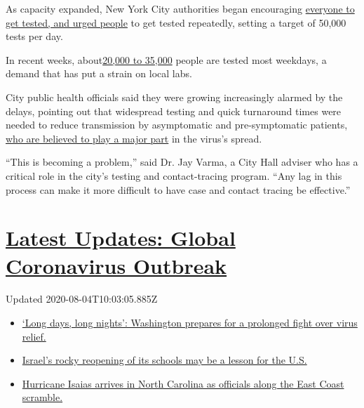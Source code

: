 As capacity expanded, New York City authorities began encouraging
\href{https://www.nychealthandhospitals.org/covid-19-testing-sites/}{everyone
to get tested, and urged people} to get tested repeatedly, setting a
target of 50,000 tests per day.

In recent weeks,
about\href{https://www1.nyc.gov/site/doh/covid/covid-19-data.page}{20,000
to 35,000} people are tested most weekdays, a demand that has put a
strain on local labs.

City public health officials said they were growing increasingly alarmed
by the delays, pointing out that widespread testing and quick turnaround
times were needed to reduce transmission by asymptomatic and
pre-symptomatic patients,
\href{https://www.nytimes.com/2020/06/27/world/europe/coronavirus-spread-asymptomatic.html}{who
are believed to play a major part} in the virus's spread.

``This is becoming a problem,'' said Dr. Jay Varma, a City Hall adviser
who has a critical role in the city's testing and contact-tracing
program. ``Any lag in this process can make it more difficult to have
case and contact tracing be effective.''

\hypertarget{latest-updates-global-coronavirus-outbreak}{%
\section{\texorpdfstring{\href{https://www.nytimes.com/2020/08/04/world/coronavirus-covid-19.html?action=click\&pgtype=Article\&state=default\&region=MAIN_CONTENT_1\&context=storylines_live_updates}{Latest
Updates: Global Coronavirus
Outbreak}}{Latest Updates: Global Coronavirus Outbreak}}\label{latest-updates-global-coronavirus-outbreak}}

Updated 2020-08-04T10:03:05.885Z

\begin{itemize}
\tightlist
\item
  \href{https://www.nytimes.com/2020/08/04/world/coronavirus-covid-19.html?action=click\&pgtype=Article\&state=default\&region=MAIN_CONTENT_1\&context=storylines_live_updates\#link-6b644638}{`Long
  days, long nights': Washington prepares for a prolonged fight over
  virus relief.}
\item
  \href{https://www.nytimes.com/2020/08/04/world/coronavirus-covid-19.html?action=click\&pgtype=Article\&state=default\&region=MAIN_CONTENT_1\&context=storylines_live_updates\#link-7af9fca0}{Israel's
  rocky reopening of its schools may be a lesson for the U.S.}
\item
  \href{https://www.nytimes.com/2020/08/04/world/coronavirus-covid-19.html?action=click\&pgtype=Article\&state=default\&region=MAIN_CONTENT_1\&context=storylines_live_updates\#link-33bf9168}{Hurricane
  Isaias arrives in North Carolina as officials along the East Coast
  scramble.}
\end{itemize}

